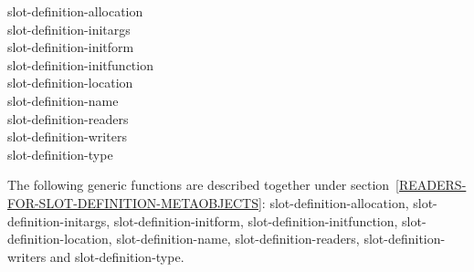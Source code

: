 \begin{defun}
slot-definition-allocation \\
slot-definition-initargs \\
slot-definition-initform \\
slot-definition-initfunction \\
slot-definition-location \\
slot-definition-name \\
slot-definition-readers \\
slot-definition-writers \\
slot-definition-type

The following generic functions are described together under
section~\ref{READERS-FOR-SLOT-DEFINITION-METAOBJECTS}:
slot-definition-allocation, slot-definition-initargs, slot-definition-initform,
slot-definition-initfunction, slot-definition-location, slot-definition-name,
slot-definition-readers, slot-definition-writers and slot-definition-type.
\end{defun}

